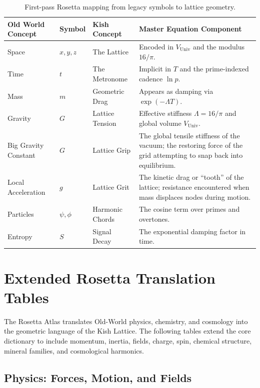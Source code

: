 \documentclass[12pt,oneside]{book}
\begin{document}
\begin{table}[H]
\centering
\begin{tabular}{>{\raggedright}p{3cm} >{\centering}p{2cm} >{\raggedright}p{4cm} >{\raggedright\arraybackslash}p{5cm}}
\toprule
\textbf{Old World Concept} & \textbf{Symbol} & \textbf{Kish Concept} & \textbf{Master Equation Component} \\
\midrule
Space & \(x,y,z\) & The Lattice & Encoded in \(V_{\text{Univ}}\) and the modulus \(16/\pi\). \\
Time & \(t\) & The Metronome & Implicit in \(T\) and the prime-indexed cadence \(\ln p\). \\
Mass & \(m\) & Geometric Drag & Appears as damping via \(\exp(-\Lambda T)\). \\
Gravity & \(G\) & Lattice Tension & Effective stiffness \(\Lambda = 16/\pi\) and global volume \(V_{\text{Univ}}\). \\
Big Gravity Constant & \(G\) & Lattice Grip & The global tensile stiffness of the vacuum; the restoring force of the grid attempting to snap back into equilibrium. \\
Local Acceleration & \(g\) & Lattice Grit & The kinetic drag or “tooth” of the lattice; resistance encountered when mass displaces nodes during motion. \\
Particles & \(\psi, \phi\) & Harmonic Chords & The cosine term over primes and overtones. \\
Entropy & \(S\) & Signal Decay & The exponential damping factor in time. \\
\bottomrule
\end{tabular}
\caption{First-pass Rosetta mapping from legacy symbols to lattice geometry.}
\end{table}


\section{Extended Rosetta Translation Tables}

The Rosetta Atlas translates Old-World physics, chemistry, and cosmology into the
geometric language of the Kish Lattice. The following tables extend the core dictionary
to include momentum, inertia, fields, charge, spin, chemical structure, mineral families,
and cosmological harmonics.

\subsection{Physics: Forces, Motion, and Fields}
\end{document}
